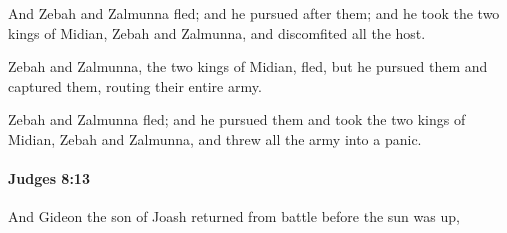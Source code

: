 			\begin{versebox}
					\item[BHS] 
					\item[ASV] And Zebah and Zalmunna fled; and he pursued after them; and he took the two kings of Midian, Zebah and Zalmunna, and discomfited all the host.
					\item[NIV] Zebah and Zalmunna, the two kings of Midian, fled, but he pursued them and captured them, routing their entire army.
					\item[NRSV] Zebah and Zalmunna fled; and he pursued them and took the two kings of Midian, Zebah and Zalmunna, and threw all the army into a panic.
			\end{versebox}

		\paragraph{Judges 8:13} %
			\label{JUDGES-8-13}

			And Gideon the son of Joash returned from battle before the sun was up,

